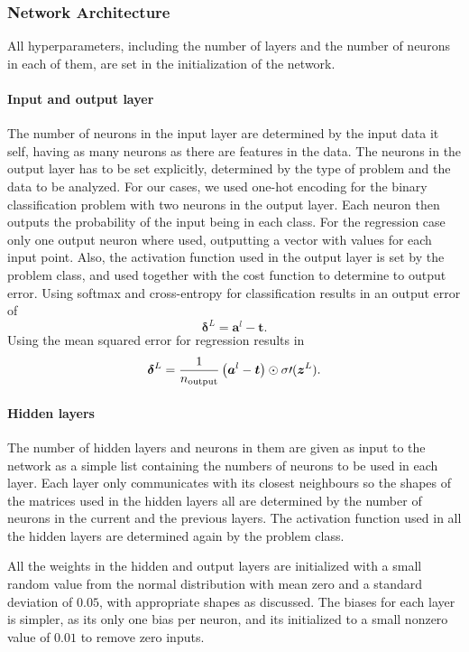 \documentclass[10pt, twocolumn]{article}
\begin{document}
\subsubsection{Network Architecture}
\label{subsubsec:Method/NN/architecture}
All hyperparameters, including the number of layers and the number of neurons in each of them, are set in the initialization of the network. 

\paragraph{Input and output layer} The number of neurons in the input layer are determined by the input data it self, having as many neurons as there are features in the data. The neurons in the output layer has to be set explicitly, determined by the type of problem and the data to be analyzed. For our cases, we used one-hot encoding for the binary classification problem with two neurons in the output layer. Each neuron then outputs the probability of the input being in each class. For the regression case only one output neuron where used, outputting a vector with values for each input point. Also, the activation function used in the output layer is set by the problem class, and used together with the cost function to determine to output error. Using softmax and cross-entropy for classification results in an output error of
\begin{equation}
    \bm{\delta}^L = \bm{a}^l-\bm{t}.
\end{equation}
Using the mean squared error for regression results in
\begin{equation}
    \bm{\delta}^L = \frac{1}{n_{\rm{output}}}\left(\bm{a}^l-\bm{t}\right)\odot \sigma\prime(\bm{z}^L).
\end{equation}

\paragraph{Hidden layers} The number of hidden layers and neurons in them are given as input to the network as a simple list containing the numbers of neurons to be used in each layer. Each layer only communicates with its closest neighbours so the shapes of the matrices used in the hidden layers all are determined by the number of neurons in the current and the previous layers. The activation function used in all the hidden layers are determined again by the problem class.

All the weights in the hidden and output layers are initialized with a small random value from the normal distribution with mean zero and a standard deviation of $0.05$, with appropriate shapes as discussed. The biases for each layer is simpler, as its only one bias per neuron, and its initialized to a small nonzero value of $0.01$ to remove zero inputs.
\end{document}
